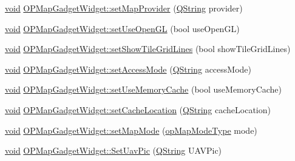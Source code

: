 \begin{DoxyCompactItemize}
\item 
\hyperlink{group___u_a_v_objects_plugin_ga444cf2ff3f0ecbe028adce838d373f5c}{void} \hyperlink{group___o_p_map_plugin_gab677b7feb42a6edd833e63325d2a928b}{\-O\-P\-Map\-Gadget\-Widget\-::set\-Map\-Provider} (\hyperlink{group___u_a_v_objects_plugin_gab9d252f49c333c94a72f97ce3105a32d}{\-Q\-String} provider)
\item 
\hyperlink{group___u_a_v_objects_plugin_ga444cf2ff3f0ecbe028adce838d373f5c}{void} \hyperlink{group___o_p_map_plugin_ga98807be867cfbdd8a0eeb05835b63a75}{\-O\-P\-Map\-Gadget\-Widget\-::set\-Use\-Open\-G\-L} (bool use\-Open\-G\-L)
\item 
\hyperlink{group___u_a_v_objects_plugin_ga444cf2ff3f0ecbe028adce838d373f5c}{void} \hyperlink{group___o_p_map_plugin_ga30af002abadbc8e420a9fe75f5042765}{\-O\-P\-Map\-Gadget\-Widget\-::set\-Show\-Tile\-Grid\-Lines} (bool show\-Tile\-Grid\-Lines)
\item 
\hyperlink{group___u_a_v_objects_plugin_ga444cf2ff3f0ecbe028adce838d373f5c}{void} \hyperlink{group___o_p_map_plugin_ga5187482d55aa0753cb6395bef5c402dd}{\-O\-P\-Map\-Gadget\-Widget\-::set\-Access\-Mode} (\hyperlink{group___u_a_v_objects_plugin_gab9d252f49c333c94a72f97ce3105a32d}{\-Q\-String} access\-Mode)
\item 
\hyperlink{group___u_a_v_objects_plugin_ga444cf2ff3f0ecbe028adce838d373f5c}{void} \hyperlink{group___o_p_map_plugin_gad5bce7bba1964ba7d8303ec72e107dd8}{\-O\-P\-Map\-Gadget\-Widget\-::set\-Use\-Memory\-Cache} (bool use\-Memory\-Cache)
\item 
\hyperlink{group___u_a_v_objects_plugin_ga444cf2ff3f0ecbe028adce838d373f5c}{void} \hyperlink{group___o_p_map_plugin_gab99ed3caf53adec86782ef89c0e8f47a}{\-O\-P\-Map\-Gadget\-Widget\-::set\-Cache\-Location} (\hyperlink{group___u_a_v_objects_plugin_gab9d252f49c333c94a72f97ce3105a32d}{\-Q\-String} cache\-Location)
\item 
\hyperlink{group___u_a_v_objects_plugin_ga444cf2ff3f0ecbe028adce838d373f5c}{void} \hyperlink{group___o_p_map_plugin_gafe9c5443c9ed4947f2072bf8feba9673}{\-O\-P\-Map\-Gadget\-Widget\-::set\-Map\-Mode} (\hyperlink{group___o_p_map_plugin_ga10cb3e7dfbac87e40e00c1a8c76c16e5}{op\-Map\-Mode\-Type} mode)
\item 
\hyperlink{group___u_a_v_objects_plugin_ga444cf2ff3f0ecbe028adce838d373f5c}{void} \hyperlink{group___o_p_map_plugin_gaada757b80b86bdf8e272319a861e2f73}{\-O\-P\-Map\-Gadget\-Widget\-::\-Set\-Uav\-Pic} (\hyperlink{group___u_a_v_objects_plugin_gab9d252f49c333c94a72f97ce3105a32d}{\-Q\-String} \-U\-A\-V\-Pic)

\end{DoxyCompactItemize}
